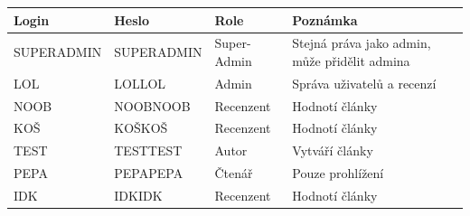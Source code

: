 \documentclass[12pt,a4paper]{article}
\begin{document}
\begin{center}
\renewcommand{\arraystretch}{1.5}
\begin{tabular}{|l|l|l|l|}
\hline
\textbf{Login} & \textbf{Heslo} & \textbf{Role} & \textbf{Poznámka} \\ \hline
SUPERADMIN & SUPERADMIN & Super-Admin & Stejná práva jako admin, může přidělit admina \\ \hline
LOL & LOLLOL & Admin & Správa uživatelů a recenzí \\ \hline
NOOB & NOOBNOOB & Recenzent & Hodnotí články \\ \hline
KOŠ & KOŠKOŠ & Recenzent & Hodnotí články \\ \hline
TEST & TESTTEST & Autor & Vytváří články \\ \hline
PEPA & PEPAPEPA & Čtenář & Pouze prohlížení \\ \hline
IDK & IDKIDK & Recenzent & Hodnotí články \\ \hline
\end{tabular}
\end{center}
\end{document}

